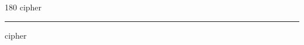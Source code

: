 
\begin{frame}
\begin{center}
\begin{turn}{180}
{\fontsize{2.5cm}{1em}\selectfont cipher}
\end{turn}
\vspace{1em}\par  
\hrule
\vspace{1em}\par  
{\fontsize{2.5cm}{1em}\selectfont cipher}
\end{center}
\end{frame}
